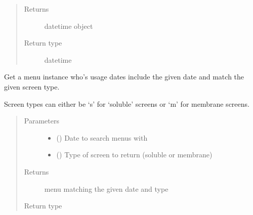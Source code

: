 \documentclass[letterpaper,10pt,english]{sphinxmanual}
\begin{document}
\begin{fulllineitems}
\begin{fulllineitems}
\begin{quote}
\begin{description}
\item[{Returns}] \leavevmode
datetime object

\item[{Return type}] \leavevmode
datetime

\end{description}\end{quote}

\end{fulllineitems}


\begin{fulllineitems}
\label{\detokenize{polo.utils:polo.utils.io_utils.BarTender.get_menu_by_date}}
Get a menu instance who’s usage dates include the given date and
match the given screen type.

Screen types can either be ‘s’ for ‘soluble’ screens or ‘m’ for
membrane screens.
\begin{quote}\begin{description}
\item[{Parameters}] \leavevmode\begin{itemize}
\item {} 
 () \textendash{} Date to search menus with

\item {} 
 () \textendash{} Type of screen to return (soluble or membrane)

\end{itemize}

\item[{Returns}] \leavevmode
menu matching the given date and type

\item[{Return type}] \leavevmode
{\hyperref[\detokenize{polo.utils:polo.utils.io_utils.Menu}]{}}

\end{description}\end{quote}

\end{fulllineitems}


\end{fulllineitems}
\end{document}
